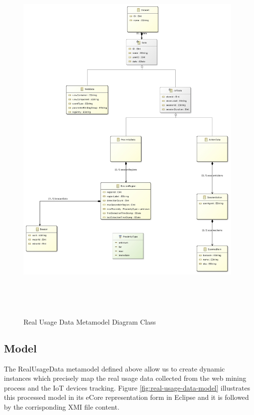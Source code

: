 \vspace{0.5cm}
\begin{figure}[H]
  \centering
    \includegraphics[height=19cm]{images/diagrams/RealUsageDataMetamodel.jpg}
  \caption{Real Usage Data Metamodel Diagram Class}
  \label{fig:real-usage-data-metamodel-diagram}
\end{figure}
\vspace{0.5cm}

\newpage
\subsection{Model}
\label{real-usage-data-model}
The RealUsageData metamodel defined above allow us to create dynamic instances which precisely map the real usage data collected from the web mining process and the IoT devices tracking. Figure \ref{fig:real-usage-data-model} illustrates this processed model in its eCore representation form in Eclipse and it is followed by the corrisponding XMI file content.

